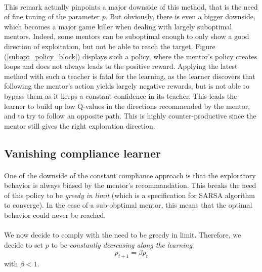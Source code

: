\documentclass[a4paper]{report}
\begin{document}
{{{			\paragraph{} This remark actually pinpoints a major downside of this method, that is the need of fine tuning of the parameter $p$. But obviously, there is even a bigger downside, which becomes a major game killer when dealing with largely suboptimal mentors. Indeed, some mentors can be suboptimal enough to only show a good direction of exploitation, but not be able to reach the target. Figure (\ref{subopt_policy_block}) displays such a policy, where the mentor's policy creates loops and does not always leads to the positive reward.  \newline
			Applying the latest method with such a teacher is fatal for the learning, as the learner discovers that following the mentor's action yields largely negative rewards, but is not able to bypass them as it keeps a constant confidence in its teacher. This leads the learner to build up low Q-values in the directions recommended by the mentor, and to try to follow an opposite path. This is highly counter-productive since the mentor still gives the right exploration direction. 
		
		\subsection{Vanishing compliance learner}
		{
			\paragraph{} One of the downside of the constant compliance approach is that the exploratory behavior is always biased by the mentor's recommandation. This breaks the need of this policy to be \emph{greedy in limit} (which is a specification for SARSA algorithm to converge). In the case of a sub-obptimal mentor, this means that the optimal behavior could never be reached. 
			
			\paragraph{} We now decide to comply with the need to be greedy in limit. Therefore, we decide to set $p$ to be \emph{constantly decreasing along the learning}: 
			\begin{equation}
				p_{t+1} = \beta p_{t}
			\end{equation}
			with $\beta < 1$. 
			
}}}}
\end{document}
